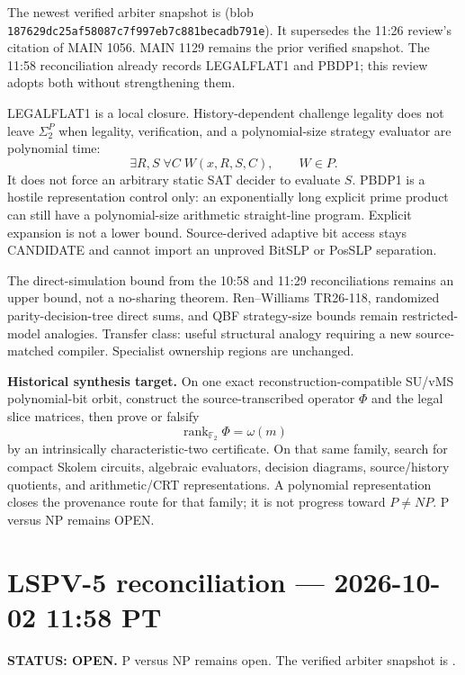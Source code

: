 \documentclass[11pt]{article}
\begin{document}
The newest verified arbiter snapshot is
(blob \texttt{187629dc25af58087c7f997eb7c881becadb791e}).
It supersedes the 11:26 review's citation of MAIN 1056. MAIN 1129 remains the prior verified
snapshot. The 11:58 reconciliation already records LEGALFLAT1 and PBDP1; this review adopts both
without strengthening them.

LEGALFLAT1 is a local closure. History-dependent challenge legality does not leave
\(\Sigma_2^P\) when legality, verification, and a polynomial-size strategy evaluator are
polynomial time:
\[
\exists R,S\;\forall C\;W(x,R,S,C),\qquad W\in P.
\]
It does not force an arbitrary static SAT decider to evaluate \(S\). PBDP1 is a hostile
representation control only: an exponentially long explicit prime product can still have a
polynomial-size arithmetic straight-line program. Explicit expansion is not a lower bound.
Source-derived adaptive bit access stays CANDIDATE and cannot import an unproved BitSLP or
PosSLP separation.

The direct-simulation bound from the 10:58 and 11:29 reconciliations remains an upper bound,
not a no-sharing theorem. Ren--Williams TR26-118, randomized parity-decision-tree direct sums,
and QBF strategy-size bounds remain restricted-model analogies. Transfer class: useful
structural analogy requiring a new source-matched compiler. Specialist ownership regions are
unchanged.

\begin{candidatebox}
\textbf{Historical synthesis target.}
On one exact reconstruction-compatible SU/vMS polynomial-bit orbit, construct the
source-transcribed operator \(\Phi\) and the legal slice matrices, then prove or falsify
\[
\operatorname{rank}_{\mathbb F_2}\Phi=\omega(m)
\]
by an intrinsically characteristic-two certificate. On that same family, search for compact
Skolem circuits, algebraic evaluators, decision diagrams, source/history quotients, and
arithmetic/CRT representations. A polynomial representation closes the provenance route for
that family; it is not progress toward \(P\neq NP\). P versus NP remains OPEN.
\end{candidatebox}


\section{LSPV-5 reconciliation --- 2026-10-02 11:58 PT}
\textbf{STATUS: OPEN.} P versus NP remains open. The verified arbiter snapshot is
.
\end{document}
